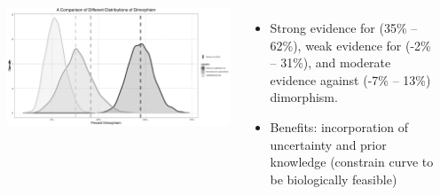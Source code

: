 \documentclass[
  landscape,
  a0paper,
  20pt,
  margin=0mm,
  innermargin=10mm,
  blockverticalspace=0mm,
  colspace=5mm,
]{tikzposter} %
\begin{document}
\begin{columns}
{\begin{tikzfigure}
\begin{minipage}[b]{0.3\colwidth}
  \end{minipage}
\end{tikzfigure} 

\begin{tikzfigure}
  \centering
  \includegraphics[width=0.9\colwidth]{images/combinedDimorphism-poster.png}
\end{tikzfigure}
  \begin{itemize}
    \item Strong evidence for \maia{} (35\% -- 62\%), weak evidence for \psit{} (-2\% -- 31\%), and moderate evidence against \tyran{} (-7\% -- 13\%) dimorphism.
    \item Benefits: incorporation of uncertainty and prior knowledge (constrain curve to be biologically feasible)
  \end{itemize}
}


\end{columns}
\end{document}
